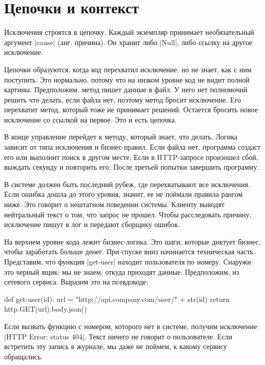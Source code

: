 \section{Цепочки и контекст}

Исключения строятся в цепочку. Каждый экземпляр принимает необязательный
аргумент \spverb|cause| (анг. причина). Он хранит либо \spverb|Null|, либо
ссылку на другое исключение.

Цепочки образуются, когда код перехватил исключение, но не знает, как с ним
поступить.  Это нормально, потому что на низком уровне код не видит полной
картины. Предположим, метод пишет данные в файл. У него нет полномочий решить
что делать, если файла нет, поэтому метод бросит исключение. Его перехватит
метод, который тоже не принимает решений. Остается бросить новое исключение со
ссылкой на первое. Это и есть цепочка.

В конце управление перейдет к методу, который знает, что делать. Логика зависит
от типа исключения и бизнес-правил. Если файла нет, программа создаст его или
выполнит поиск в другом месте. Если в HTTP-запросе произошел сбой, выждать
секунду и повторить его. После третьей попытки завершить программу.

В системе должен быть последний рубеж, где перехватывают все исключения. Если
ошибка дошла до этого уровня, значит, ее не поймали правила рангом ниже. Это
говорит о нештатном поведении системы. Клиенту выводят нейтральный текст о том,
что запрос не прошел. Чтобы расследовать причину, исключение пишут в лог и
передают сборщику ошибок.

На верхнем уровне кода лежит бизнес-логика. Это шаги, которые диктует бизнес,
чтобы заработать больше денег. При спуске вниз начинается техническая
часть. Представим, что функция \spverb|get-user| находит пользователя по
номеру. Снаружи это черный ящик: мы не знаем, откуда приходят
данные. Предположим, из сетевого сервиса. Выразим это на псевдокоде:

\begin{english}
  \begin{python}
def get-user(id):
  url = "http://api.company.com/user/" + str(id)
  return http.GET(url).body.json()
  \end{python}
\end{english}

Если вызвать функцию с номером, которого нет в системе, получим исключение
\spverb|HTTP Error: status 404|. Текст ничего не говорит о пользователе. Если
встретить эту запись в журнале, мы даже не поймем, к какому сервису обращались.

